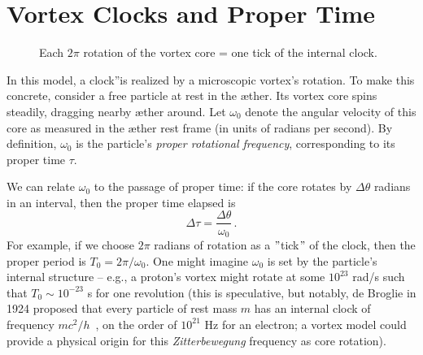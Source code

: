 \section{Vortex Clocks and Proper Time}

\begin{figure}[H]
    \centering
    \caption{Each $2\pi$ rotation of the vortex core = one tick of the internal clock.}
    \label{fig:wervelklok}
\end{figure}

In this model, a \grqq clock\textquotedblright is realized by a microscopic vortex's rotation. To make this concrete, consider a free particle at rest in the æther. Its vortex core spins steadily, dragging nearby æther around. Let $\omega_0$ denote the angular velocity of this core as measured in the æther rest frame (in units of radians per second). By definition, $\omega_0$ is the particle's \emph{proper rotational frequency}, corresponding to its proper time $\tau$.

We can relate $\omega_0$ to the passage of proper time: if the core rotates by $\Delta \theta$ radians in an interval, then the proper time elapsed is
\[
\Delta \tau = \frac{\Delta \theta}{\omega_0} \,.
\]
For example, if we choose $2\pi$ radians of rotation as a \("\)tick\("\) of the clock, then the proper period is $T_0 = 2\pi/\omega_0$. One might imagine $\omega_0$ is set by the particle's internal structure – e.g., a proton's vortex might rotate at some $10^{23}$ rad/s such that $T_0 \sim 10^{-23}$ s for one revolution (this is speculative, but notably, de Broglie in 1924 proposed that every particle of rest mass $m$ has an internal clock of frequency $mc^2/h$~\cite{deBroglie1924-frequency}, on the order of $10^{21}$ Hz for an electron; a vortex model could provide a physical origin for this \emph{Zitterbewegung} frequency as core rotation).

